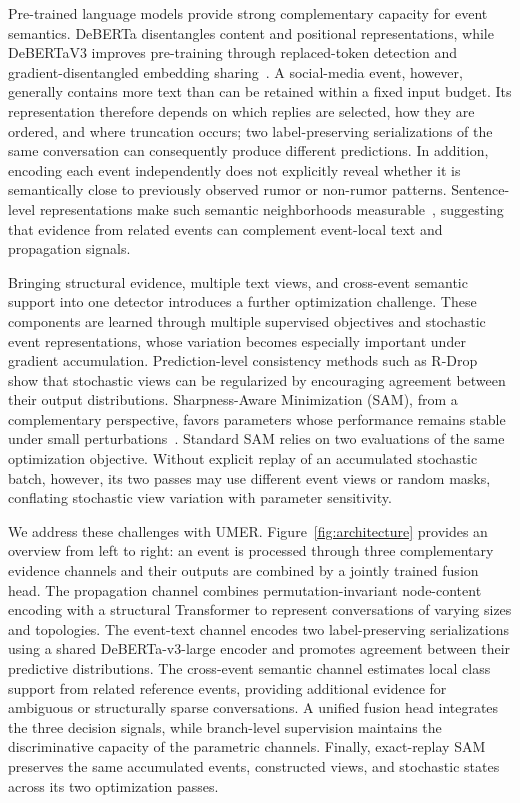 \documentclass[sigconf,anonymous,review]{../acmart/acmart}
\begin{document}
Pre-trained language models provide strong complementary capacity for event
semantics. DeBERTa disentangles content and positional representations, while
DeBERTaV3 improves pre-training through replaced-token detection and
gradient-disentangled embedding sharing~\cite{he2021deberta,
he2023debertav3}. A social-media event, however, generally contains more text
than can be retained within a fixed input budget. Its representation
therefore depends on which replies are selected, how they are ordered, and
where truncation occurs; two label-preserving serializations of the same
conversation can consequently produce different predictions. In addition,
encoding each event independently does not explicitly reveal whether it is
semantically close to previously observed rumor or non-rumor patterns.
Sentence-level representations make such semantic neighborhoods
measurable~\cite{reimers2019sbert}, suggesting that evidence from related
events can complement event-local text and propagation signals.

Bringing structural evidence, multiple text views, and cross-event semantic
support into one detector introduces a further optimization challenge. These
components are learned through multiple supervised objectives and stochastic
event representations, whose variation becomes especially important under
gradient accumulation. Prediction-level consistency methods such as
R-Drop~\cite{liang2021rdrop} show that stochastic views can be regularized by
encouraging agreement between their output distributions. Sharpness-Aware
Minimization (SAM), from a complementary perspective, favors parameters whose
performance remains stable under small perturbations~\cite{foret2021sam}.
Standard SAM relies on two evaluations of the same optimization objective.
Without explicit replay of an accumulated stochastic batch, however, its two
passes may use different event views or random masks, conflating stochastic
view variation with parameter sensitivity.

We address these challenges with UMER. Figure~\ref{fig:architecture}
provides an overview from left to right: an event is processed through three
complementary evidence channels and their outputs are combined by a jointly
trained fusion head. The propagation channel combines permutation-invariant
node-content encoding with a structural Transformer to represent
conversations of varying sizes and topologies. The event-text channel encodes
two label-preserving serializations using a shared DeBERTa-v3-large encoder
and promotes agreement between their predictive distributions. The
cross-event semantic channel estimates local class support from related
reference events, providing additional evidence for ambiguous or structurally
sparse conversations. A unified fusion head integrates the three decision
signals, while branch-level supervision maintains the discriminative capacity
of the parametric channels. Finally, exact-replay SAM preserves the same
accumulated events, constructed views, and stochastic states across its two
optimization passes.
\end{document}
